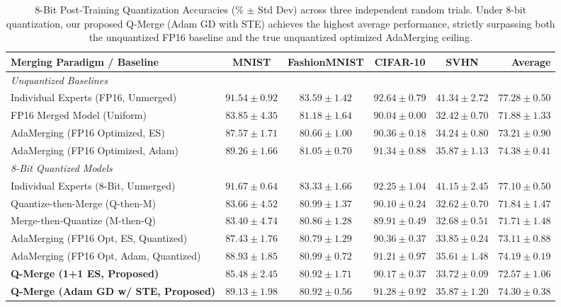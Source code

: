 \begin{table}[t]
\caption{8-Bit Post-Training Quantization Accuracies (\% $\pm$ Std Dev) across three independent random trials. Under 8-bit quantization, our proposed Q-Merge (Adam GD with STE) achieves the highest average performance, strictly surpassing both the unquantized FP16 baseline and the true unquantized optimized AdaMerging ceiling.}
\label{tab:8bit_results}
\vskip 0.15in
\begin{center}
\begin{small}
\begin{sc}
\setlength{\tabcolsep}{4pt}
\begin{tabular}{lccccr}
\toprule
Merging Paradigm / Baseline & MNIST & FashionMNIST & CIFAR-10 & SVHN & \textbf{Average} \\
\midrule
\textit{Unquantized Baselines} \\
Individual Experts (FP16, Unmerged) & $91.54 \pm 0.92$ & $83.59 \pm 1.42$ & $92.64 \pm 0.79$ & $41.34 \pm 2.72$ & $\mathbf{77.28 \pm 0.50}$ \\
FP16 Merged Model (Uniform)      & $83.85 \pm 4.35$ & $81.18 \pm 1.64$ & $90.04 \pm 0.00$ & $32.42 \pm 0.70$ & $\mathbf{71.88 \pm 1.33}$ \\
AdaMerging (FP16 Optimized, ES)  & $87.57 \pm 1.71$ & $80.66 \pm 1.00$ & $90.36 \pm 0.18$ & $34.24 \pm 0.80$ & $\mathbf{73.21 \pm 0.90}$ \\
AdaMerging (FP16 Optimized, Adam)& $89.26 \pm 1.66$ & $81.05 \pm 0.70$ & $91.34 \pm 0.88$ & $35.87 \pm 1.13$ & $\mathbf{74.38 \pm 0.41}$ \\
\midrule
\textit{8-Bit Quantized Models} \\
Individual Experts (8-Bit, Unmerged) & $91.67 \pm 0.64$ & $83.33 \pm 1.66$ & $92.25 \pm 1.04$ & $41.15 \pm 2.45$ & $\mathbf{77.10 \pm 0.50}$ \\
Quantize-then-Merge (Q-then-M)  & $83.66 \pm 4.52$ & $80.99 \pm 1.37$ & $90.10 \pm 0.24$ & $32.62 \pm 0.70$ & $\mathbf{71.84 \pm 1.47}$ \\
Merge-then-Quantize (M-then-Q)  & $83.40 \pm 4.74$ & $80.86 \pm 1.28$ & $89.91 \pm 0.49$ & $32.68 \pm 0.51$ & $\mathbf{71.71 \pm 1.48}$ \\
AdaMerging (FP16 Opt, ES, Quantized) & $87.43 \pm 1.76$ & $80.79 \pm 1.29$ & $90.36 \pm 0.37$ & $33.85 \pm 0.24$ & $\mathbf{73.11 \pm 0.88}$ \\
AdaMerging (FP16 Opt, Adam, Quantized)& $88.93 \pm 1.85$ & $80.99 \pm 0.72$ & $91.21 \pm 0.97$ & $35.61 \pm 1.48$ & $\mathbf{74.19 \pm 0.19}$ \\
\midrule
\textbf{Q-Merge (1+1 ES, Proposed)} & $85.48 \pm 2.45$ & $80.92 \pm 1.71$ & $90.17 \pm 0.37$ & $33.72 \pm 0.09$ & $\mathbf{72.57 \pm 1.06}$ \\
\textbf{Q-Merge (Adam GD w/ STE, Proposed)} & $89.13 \pm 1.98$ & $80.92 \pm 0.56$ & $91.28 \pm 0.92$ & $35.87 \pm 1.20$ & $\mathbf{74.30 \pm 0.38}$ \\
\bottomrule
\end{tabular}
\end{sc}
\end{small}
\end{center}
\vskip -0.1in
\end{table}

